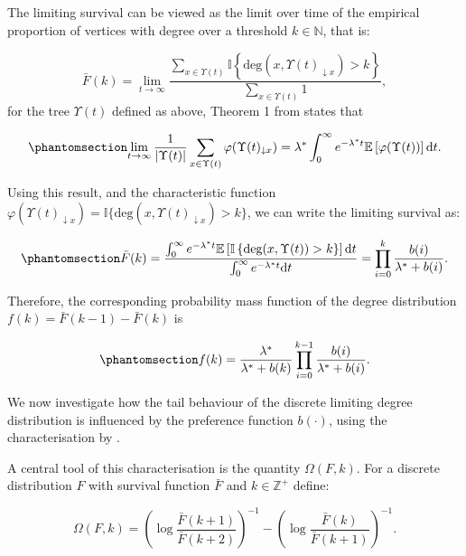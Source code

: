 \documentclass[
  sn-basic,
  10pt,
]{sn-jnl}
\theoremstyle{thmstyleone}
\theoremstyle{thmstyleone}
\theoremstyle{remark}
\theoremstyle{plain}
\theoremstyle{plain}
\theoremstyle{remark}
\begin{document}
The limiting survival can be viewed as the limit over time of the
empirical proportion of vertices with degree over a threshold
\(k\in\mathbb N\), that is:

\[
\bar F(k) = \lim_{t\rightarrow\infty}\frac{\sum_{x\in\Upsilon(t)}\mathbb I\left\{\text{deg}(x,\Upsilon(t)_{\downarrow x})>k\right\}}{\sum_{x\in\Upsilon(t)} 1},
\] for the tree \(\Upsilon(t)\) defined as above, Theorem 1 from
\citet{rudas07} states that

\begin{equation}\phantomsection\label{eq-survlim}{
\lim_{t\rightarrow\infty}\frac{1}{|\Upsilon(t)|}\sum_{x\in\Upsilon(t)}\varphi(\Upsilon(t)_{\downarrow x}) = \lambda^* \int_0^\infty e^{-\lambda^* t}\mathbb E\left[\varphi(\Upsilon(t))\right]\text{d}t.
}\end{equation}

Using this result, and the characteristic function
\(\varphi(\Upsilon(t)_{\downarrow x}) = \mathbb I\{\text{deg}(x,\Upsilon(t)_{\downarrow x})>k\}\),
we can write the limiting survival as:

\begin{equation}\phantomsection\label{eq-surv-origin}{
\bar F(k) = \frac{\int_0^\infty e^{-\lambda^* t}\mathbb E\left[\mathbb I\left\{\text{deg}(x,\Upsilon(t))>k\right\}\right]\text{d}t}{\int_0^\infty e^{-\lambda^* t}\text{d}t} = \prod_{i=0}^k\frac{b(i)}{\lambda^* + b(i)}.
}\end{equation}

Therefore, the corresponding probability mass function of the degree
distribution \(f(k) = \bar F(k-1) - \bar F(k)\) is

\begin{equation}\phantomsection\label{eq-pmf-origin}{
f(k) = \frac{\lambda^*}{\lambda^* + b(k)}\prod_{i=0}^{k-1}\frac{b(i)}{\lambda^*+b(i)}.
}\end{equation}

We now investigate how the tail behaviour of the discrete limiting
degree distribution is influenced by the preference function \(b(·)\),
using the characterisation by \citet{shimura12}.

A central tool of this characterisation is the quantity \(\Omega(F,k)\).
For a discrete distribution \(F\) with survival function \(\bar F\) and
\(k\in\mathbb Z^+\) define:

\[
\Omega(F,k) = \left(\log\displaystyle\frac{\bar F (k+1)}{\bar F (k+2)}\right)^{-1} - \left(\log\displaystyle\frac{\bar F (k)}{\bar F (k+1)}\right)^{-1}.
\]
\end{document}
